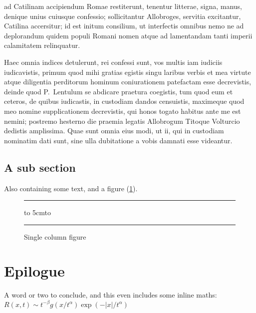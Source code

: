 \documentclass{ifacmtg}
\begin{document}
ad Catilinam accipiendum Romae restiterunt, tenentur litterae, signa,
manus, denique unius cuiusque confessio; sollicitantur Allobroges,
servitia excitantur, Catilina accersitur; id est initum consilium, ut
interfectis omnibus nemo ne ad deplorandum quidem populi Romani nomen
atque ad lamentandam tanti imperii calamitatem relinquatur. \par Haec omnia
indices detulerunt, rei confessi sunt, vos multis iam iudiciis
iudicavistis, primum quod mihi gratias egistis singu laribus verbis et
mea virtute atque diligentia perditorum hominum coniurationem patefactam
esse decrevistis, deinde quod P.~Lentulum se abdicare praetura
coegistis, tum quod eum et ceteros, de quibus iudicastis, in custodiam
dandos censuistis, maximeque quod meo nomine supplicationem decrevistis,
qui honos togato habitus ante me est nemini; postremo hesterno die
praemia legatis Allobrogum Titoque Volturcio dedistis amplissima. Quae
sunt omnia eius modi, ut ii, qui in custodiam nominatim dati sunt, sine
ulla dubitatione a vobis damnati esse videantur.

\subsection{A sub section}
Also containing some text, and a figure (\ref{f1}).
\begin{figure}
\hrule
\vbox to 5cm{\vfill \hbox to \vfill}
\hrule
\caption{Single column figure}
\label{f1}
\end{figure}

\section{Epilogue}
A word or two to conclude,  and this even includes some
inline maths: \(R(x,t)\sim
t^{-\beta}g(x/t^\alpha)\exp(-|x|/t^\alpha)\)
\end{document}
